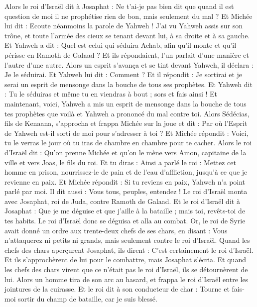 \begin{multicols}{2}
Alors le roi d'Israël dit à Josaphat : Ne t'ai-je pas bien dit que quand il est question de moi il ne prophétise rien de bon, mais seulement du mal ?
Et Michée lui dit : Ecoute néanmoins la parole de Yahweh ! J'ai vu Yahweh assis sur son trône, et toute l'armée des cieux se tenant devant lui, à sa droite et à sa gauche.
Et Yahweh a dit : Quel est celui qui séduira Achab, afin qu'il monte et qu'il périsse en Ramoth de Galaad ? Et ils répondaient, l'un parlait d'une manière et l'autre d'une autre.
Alors un esprit s'avança et se tint devant Yahweh, il déclara : Je le séduirai. Et Yahweh lui dit : Comment ?
Et il répondit : Je sortirai et je serai un esprit de mensonge dans la bouche de tous ses prophètes. Et Yahweh dit : Tu le séduiras et même tu en viendras à bout ; sors et fais ainsi !
Et maintenant, voici, Yahweh a mis un esprit de mensonge dans la bouche de tous tes prophètes que voilà et Yahweh a prononcé du mal contre toi.
Alors Sédécias, fils de Kenaana, s'approcha et frappa Michée sur la joue et dit : Par où l'Esprit de Yahweh est-il sorti de moi pour s'adresser à toi ?
Et Michée répondit : Voici, tu le verras le jour où tu iras de chambre en chambre pour te cacher.
Alors le roi d'Israël dit : Qu'on prenne Michée et qu'on le mène vers Amon, capitaine de la ville et vers Joas, le fils du roi.
Et tu diras : Ainsi a parlé le roi : Mettez cet homme en prison, nourrissez-le de pain et de l’eau d’affliction, jusqu'à ce que je revienne en paix.
Et Michée répondit : Si tu reviens en paix, Yahweh n'a point parlé par moi. Il dit aussi : Vous tous, peuples, entendez !
Le roi d'Israël monta avec Josaphat, roi de Juda, contre Ramoth de Galaad.
Et le roi d'Israël dit à Josaphat : Que je me déguise et que j'aille à la bataille ; mais toi, revêts-toi de tes habits. Le roi d'Israël donc se déguisa et alla au combat.
Or, le roi de Syrie avait donné un ordre aux trente-deux chefs de ses chars, en disant : Vous n’attaquerez ni petits ni grands, mais seulement contre le roi d'Israël.
Quand les chefs des chars aperçurent Josaphat, ils dirent : C'est certainement le roi d'Israël. Et ils s’approchèrent de lui pour le combattre, mais Josaphat s'écria.
Et quand les chefs des chars virent que ce n'était pas le roi d'Israël, ils se détournèrent de lui.
Alors un homme tira de son arc au hasard, et frappa le roi d'Israël entre les jointures de la cuirasse. Et le roi dit à son conducteur de char : Tourne et fais-moi sortir du champ de bataille, car je suis blessé.

\end{multicols}
